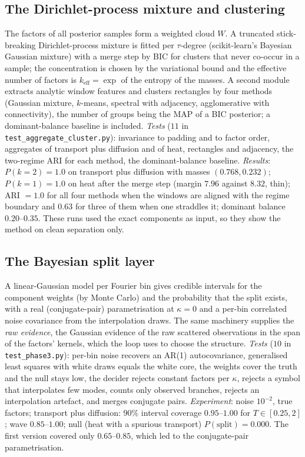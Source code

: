 \documentclass[11pt]{article}
\theoremstyle{plain}
\theoremstyle{definition}
\theoremstyle{remark}
\newcommand{\keff}{k_{\mathrm{eff}}}        %
\newcommand{\cloud}{W}                      %
\begin{document}
\subsection{The Dirichlet-process mixture and clustering}\label{sec:dp}
The factors of all posterior samples form a weighted cloud $\cloud$. A truncated stick-breaking Dirichlet-process mixture is fitted per $\tau$-degree (scikit-learn's Bayesian Gaussian mixture) with a merge step by BIC for clusters that never co-occur in a sample;
the concentration is chosen by the variational bound and the effective number of factors is $\keff=\exp$ of the entropy of the masses. A second module extracts analytic window features and clusters rectangles by four methods (Gaussian mixture, $k$-means, spectral with adjacency, agglomerative with connectivity),
the number of groups being the MAP of a BIC posterior; a dominant-balance baseline is included. \emph{Tests} ($11$ in \texttt{test\_aggregate\_cluster.py}): invariance to padding and to factor order, aggregates of transport plus diffusion and of heat, rectangles and adjacency, the two-regime ARI for each method, the dominant-balance baseline.
\emph{Results}: $P(k=2)=1.0$ on transport plus diffusion with masses $(0.768,0.232)$; $P(k=1)=1.0$ on heat after the merge step (margin $7.96$ against $8.32$, thin); ARI $=1.0$ for all four methods when the windows are aligned with the regime boundary and $0.63$ for three of them when one straddles it; dominant balance $0.20$--$0.35$.
These runs used the exact components as input, so they show the method on clean separation only.

\subsection{The Bayesian split layer}\label{sec:split}
A linear-Gaussian model per Fourier bin gives credible intervals for the component weights (by Monte Carlo) and the probability that the split exists, with a real (conjugate-pair) parametrisation at $\kappa=0$ and a per-bin correlated noise covariance from the interpolation draws.
The same machinery supplies the \emph{raw evidence}, the Gaussian evidence of the raw scattered observations in the span of the factors' kernels, which the loop uses to choose the structure. \emph{Tests} ($10$ in \texttt{test\_phase3.py}): per-bin noise recovers an AR(1) autocovariance,
generalised least squares with white draws equals the white core, the weights cover the truth and the null stays low, the decider rejects constant factors per $\kappa$, rejects a symbol that interpolates few modes, counts only observed branches, rejects an interpolation artefact, and merges conjugate pairs.
\emph{Experiment}: noise $10^{-2}$, true factors; transport plus diffusion: $90\%$ interval coverage $0.95$--$1.00$ for $T\in[0.25,2]$; wave $0.85$--$1.00$; null (heat with a spurious transport) $P(\text{split})=0.000$. The first version covered only $0.65$--$0.85$, which led to the conjugate-pair parametrisation.
\end{document}
